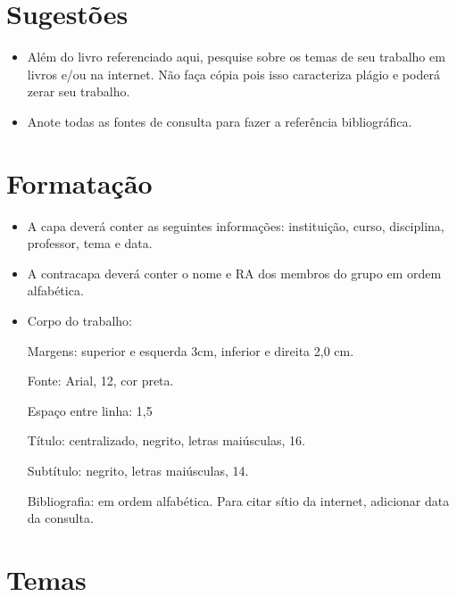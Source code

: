 \documentclass[a4paper]{article}
\begin{document}


\section{Sugestões}

\begin{itemize}
\item Além do livro referenciado aqui, pesquise sobre os temas de seu trabalho em livros e/ou na internet. Não faça cópia pois isso caracteriza plágio e poderá zerar seu trabalho.
\item Anote todas as fontes de consulta para fazer a referência bibliográfica.
\end{itemize}



\section{Formatação}

\begin{itemize}
\item A capa deverá conter as seguintes informações: instituição, curso, disciplina, professor, tema e data.
\item A contracapa deverá conter o nome e RA dos membros do grupo em ordem alfabética.
\item Corpo do trabalho:

Margens: superior e esquerda 3cm, inferior e direita 2,0 cm.

Fonte: Arial, 12, cor preta.

Espaço entre linha: 1,5

Título: centralizado, negrito, letras maiúsculas, 16.

Subtítulo: negrito, letras maiúsculas, 14.

Bibliografia: em ordem alfabética. Para citar sítio da internet, adicionar data da consulta.

\end{itemize}





\newpage
\section{Temas}
\end{document}
